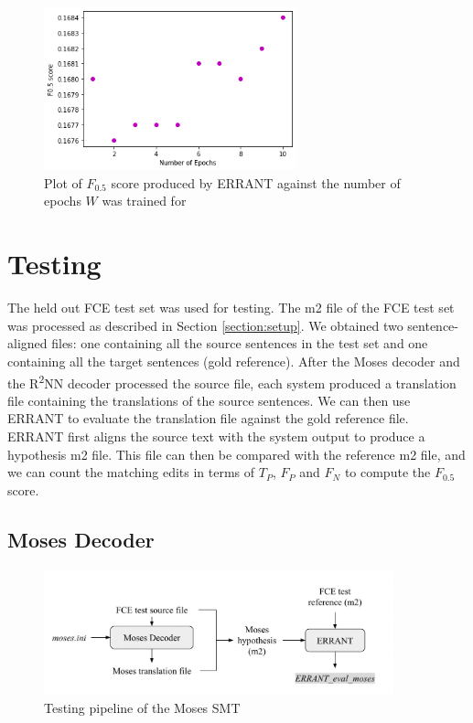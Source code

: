 \documentclass[12pt,a4paper,twoside]{report}
\begin{document}
\begin{figure}[H]
\centering
\includegraphics[width=0.65\textwidth]{images/sparse_f.png}
\caption{Plot of $F_{0.5}$ score produced by ERRANT against the number of epochs $W$ was trained for}
\label{fig:sparse_f}
\end{figure}

\section{Testing}
The held out FCE test set was used for testing. The m2 file of the FCE test set was processed as described in Section \ref{section:setup}. We obtained two sentence-aligned files: one containing all the source sentences in the test set and one containing all the target sentences (gold reference). After the Moses decoder and the R\textsuperscript{2}NN decoder processed the source file, each system produced a translation file containing the translations of the source sentences. We can then use ERRANT to evaluate the translation file against the gold reference file. ERRANT first aligns the source text with the system output to produce a hypothesis m2 file. This file can then be compared with the reference m2 file, and we can count the matching edits in terms of $T_P$, $F_P$ and $F_N$ to compute the $F_{0.5}$ score.

\subsection{Moses Decoder}
\begin{figure}[ht]
\centering
\includegraphics[width=0.9\textwidth]{images/moses_test.png}
\caption{Testing pipeline of the Moses SMT}
\label{fig:moses_test}
\end{figure}
\end{document}
